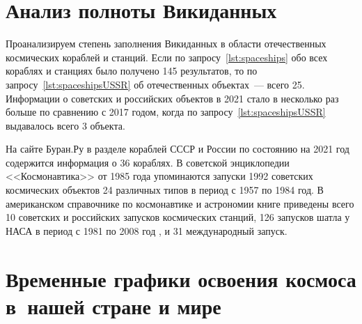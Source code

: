 \section{Анализ полноты Викиданных}

Проанализируем степень заполнения Викиданных в области отечественных космических кораблей и станций. 
Если по запросу~\ref{lst:spaceships} обо всех кораблях и станциях было получено 145 результатов, 
то по запросу~\ref{lst:spaceshipsUSSR} об отечественных объектах~--- всего 25. Информации о советских и российских объектов в 2021 стало в несколько раз больше по сравнению с 2017 годом, когда по запросу~\ref{lst:spaceshipsUSSR} выдавалось всего 3 объекта. 

На сайте Буран.Ру в разделе кораблей СССР и России по состоянию на 2021 год содержится информация о 36 кораблях\autocite{spacecraftBuran}. В советской энциклопедии <<Космонавтика>> от 1985 года упоминаются запуски 1992 советских космических объектов 24 различных типов в период с 1957 по 1984 год\autocite[~498]{spacecraftCosmonavtika}. 
В американском справочнике по космонавтике и астрономии книге приведены всего 10 советских и российских запусков космических станций\autocite[~296]{spacecraftSAA}, 126 запусков шатла у НАСА в период с 1981 по 2008 год \autocite[~288]{spacecraftSAA}, и 31 международный запуск\autocite[~290---291]{spacecraftSAA}. 

\section{Временные графики освоения космоса в~нашей стране и мире}


